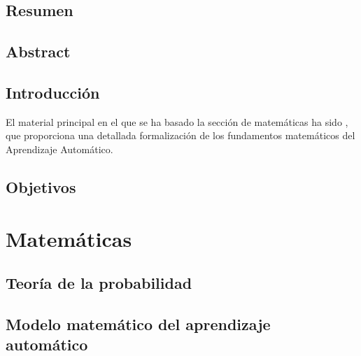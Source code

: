 \documentclass[a4paper,11pt]{report}
\makeatletter
\def@path{{./frontmatter/}}
\makeatother
\begin{document}


\chapter*{Resumen}
  
\chapter*{Abstract}
  

\setcounter{tocdepth}{1}
\tableofcontents

\break 

\setcounter{page}{1}


\makeatletter
\makeatother


\chapter*{Introducción}
  El material principal en el que se ha basado la sección de matemáticas ha sido \cite{understanding_ml}, 
  que proporciona una detallada formalización de los fundamentos matemáticos del Aprendizaje Automático.
\chapter*{Objetivos}

\part{Matemáticas}  
  \chapter{Teoría de la probabilidad}
    
  \chapter{Modelo matemático del aprendizaje automático}
    
\end{document}
